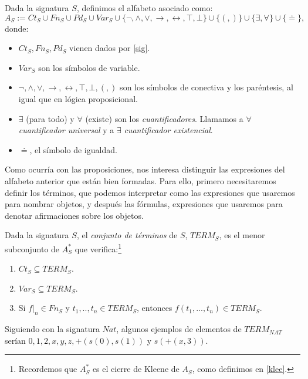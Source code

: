 \begin{definition}
Dada la signatura $S$, definimos el alfabeto asociado como:
$$A_{S} := Ct_S \cup Fn_S \cup Pd_S \cup Var_S \cup \{\neg, \land, \lor, \rightarrow, \leftrightarrow, \top, \bot \} \cup \{(, )\} \cup \{\exists, \forall\} \cup \{ \doteq \},$$
donde:
\begin{itemize}
    \item $Ct_S,Fn_S,Pd_S$ vienen dados por \ref{sig}.
    \item $Var_S$ son los símbolos de variable.
    \item $\neg, \land, \lor, \rightarrow, \leftrightarrow, \top, \bot,(,)$ son los símbolos de conectiva y los paréntesis, al igual que en lógica proposicional.
    \item $\exists$ (para todo) y $\forall$ (existe) son los \textit{cuantificadores}. Llamamos a $\forall$ \textit{cuantificador universal} y a $\exists$ \textit{cuantificador existencial}.
    \item $\doteq$, el símbolo de igualdad.
\end{itemize}
\end{definition}

Como ocurría con las proposiciones, nos interesa distinguir las expresiones del alfabeto anterior que están bien formadas. Para ello, primero necesitaremos definir los términos, que podemos interpretar como las expresiones que usaremos para nombrar objetos, y después las fórmulas, expresiones que usaremos para denotar afirmaciones sobre los objetos.

\begin{definition}
Dada la signatura $S$, el \textit{conjunto de términos} de $S$, $TERM_S$, es el menor subconjunto de $A_{S}^*$ que verifica:\footnote{Recordemos que $A_{S}^*$ es el cierre de Kleene de $A_{S}$, como definimos en \ref{klee}.}
\begin{enumerate}
    \item $Ct_S\subseteq TERM_S$.
    \item $Var_S\subseteq TERM_S$.
    \item Si $f|_{n} \in Fn_S$ y $t_1, .., t_n \in TERM_S$, entonces $f(t_1, ..., t_n) \in TERM_S$. 
\end{enumerate}
\end{definition}

\begin{example}
Siguiendo con la signatura $Nat$, algunos ejemplos de elementos de $TERM_{NAT}$ serían  $0, 1, 2, x, y, z,+(s(0), s(1))$ y $s(+(x,3))$.
\end{example}

